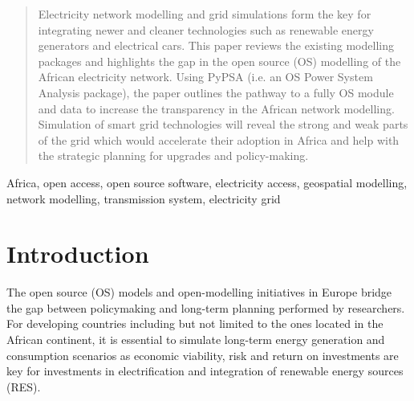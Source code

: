 \documentclass[conference, a4paper]{IEEEtran}
\begin{document}
\maketitle

\begin{abstract} %
Electricity network modelling and grid simulations form the key for integrating newer and cleaner technologies such as renewable energy generators and electrical cars. This paper reviews the existing modelling packages and highlights the gap in the open source (OS) modelling of the African electricity network.
Using PyPSA (i.e. an OS Power System Analysis package), the paper outlines the pathway to a fully OS module and data to increase the transparency in the African network modelling.
Simulation of smart grid technologies will reveal the strong and weak parts of the grid which would accelerate their adoption in Africa and help with the strategic planning for upgrades and policy-making.
\end{abstract}

\begin{IEEEkeywords} %
Africa, open access, open source software, electricity access, geospatial modelling, network modelling, transmission system, electricity grid
\end{IEEEkeywords}


 

\section{Introduction}
The open source (OS) models and open-modelling initiatives in Europe bridge the gap between policymaking and long-term planning performed by researchers. For developing countries including but not limited to the ones located in the African continent, it is essential to simulate long-term energy generation and consumption scenarios as economic viability, risk and return on investments are key for investments in electrification and integration of renewable energy sources (RES).
\end{document}
